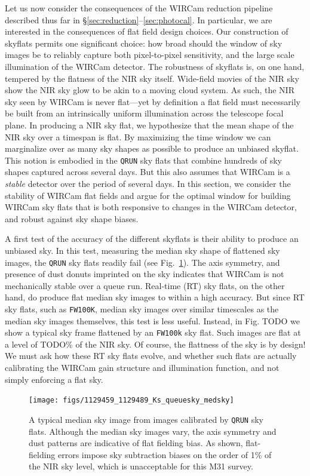 \documentclass[iop]{emulateapj}
\newcommand{\todo}[1]{\textcolor{RedOrange}{#1}} %
\newcommand{\Fig}[1]{Fig.~\ref{fig:#1}}  %
\newcommand{\Sec}[1]{\S\ref{sec:#1}}  %
\begin{document}
Let us now consider the consequences of the WIRCam reduction pipeline described thus far in \Sec{reduction}--\ref{sec:photocal}.
In particular, we are interested in the consequences of flat field design choices.
Our construction of skyflats permits one significant choice: how broad should the window of sky images be to reliably capture both pixel-to-pixel sensitivity, and the large scale illumination of the WIRCam detector.
The robustness of skyflats is, on one hand, tempered by the flatness of the NIR sky itself.
Wide-field movies of the NIR sky \citep{Adams:1996} show the NIR sky glow to be akin to a moving cloud system.
As such, the NIR sky seen by WIRCam is never flat—yet by definition a flat field must necessarily be built from an intrinsically uniform illumination across the telescope focal plane.
In producing a NIR sky flat, we hypothesize that the mean shape of the NIR sky over a timespan is flat.
By maximizing the time window we can marginalize over as many sky shapes as possible to produce an unbiased skyflat.
This notion is embodied in the \texttt{QRUN} sky flats that combine hundreds of sky shapes captured across several days.
But this also assumes that WIRCam is a \emph{stable} detector over the period of several days.
In this section, we consider the stability of WIRCam flat fields and argue for the optimal window for building WIRCam sky flats that is both responsive to changes in the WIRCam detector, and robust against sky shape biases.

A first test of the accuracy of the different skyflats is their ability to produce an unbiased sky.
In this test, measuring the median sky shape of flattened sky images, the \texttt{QRUN} sky flats readily fail (see \Fig{qrun_median_sky}).
The axis symmetry, and presence of dust donuts imprinted on the sky indicates that WIRCam is not mechanically stable over a queue run.
Real-time (RT) sky flats, on the other hand, do produce flat median sky images to within a high accuracy.
But since RT sky flats, such as \texttt{FW100K}, median sky images over similar timescales as the median sky images themselves, this test is less useful.
Instead, in \todo{Fig. TODO} we show a typical sky frame flattened by an \texttt{FW100k} sky flat.
Such images are flat at a level of \todo{TODO}\% of the NIR sky.
Of course, the flattness of the sky is by design! We must ask how these RT sky flats evolve, and whether such flats are actually calibrating the WIRCam gain structure and illumination function, and not simply enforcing a flat sky.

\begin{figure}[t]
\centering
\texttt{[image: figs/1129459\_1129489\_Ks\_queuesky\_medsky]}
\caption{A typical median sky image from images calibrated by \texttt{QRUN} sky flats. Although the median sky images vary,  the axis symmetry and dust patterns are indicative of flat fielding bias. As shown, flat-fielding errors impose sky subtraction biases on the order of 1\% of the NIR sky level, which is unacceptable for this M31 survey.}
\label{fig:qrun_median_sky}
\end{figure}
\end{document}
